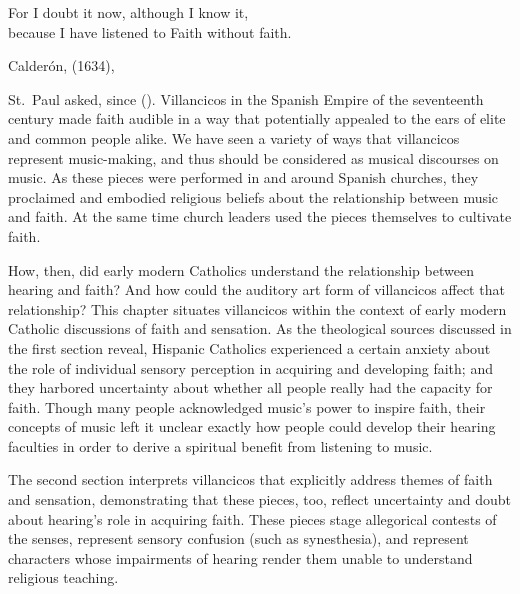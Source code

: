 


\label{ch:faith-hearing}

\epigraph
{For I doubt it now, although I know it,\\
because I have listened to Faith without faith.}
{Calderón,  (1634), }

 St.\ Paul asked, since  ().
Villancicos in the Spanish Empire of the seventeenth century made faith audible in a way that potentially appealed to the ears of elite and common people alike.
We have seen a variety of ways that villancicos represent music-making, and thus should be considered as musical discourses on music.
As these pieces were performed in and around Spanish churches, they proclaimed and embodied religious beliefs about the relationship between music and faith.
At the same time church leaders used the pieces themselves to cultivate faith.

How, then, did early modern Catholics understand the relationship between hearing and faith?
And how could the auditory art form of villancicos affect that relationship?
This chapter situates villancicos within the context of early modern Catholic discussions of faith and sensation.
As the theological sources discussed in the first section reveal, Hispanic Catholics experienced a certain anxiety about the role of individual sensory perception in acquiring and developing faith; and they harbored uncertainty about whether all people really had the capacity for faith.
Though many people acknowledged music's power to inspire faith, their concepts of music left it unclear exactly how people could develop their hearing faculties in order to derive a spiritual benefit from listening to music.

The second section interprets villancicos that explicitly address themes of faith and sensation, demonstrating that these pieces, too, reflect uncertainty and doubt about hearing's role in acquiring faith.
These pieces stage allegorical contests of the senses, represent sensory confusion (such as synesthesia), and represent characters whose impairments of hearing render them unable to understand religious teaching.

